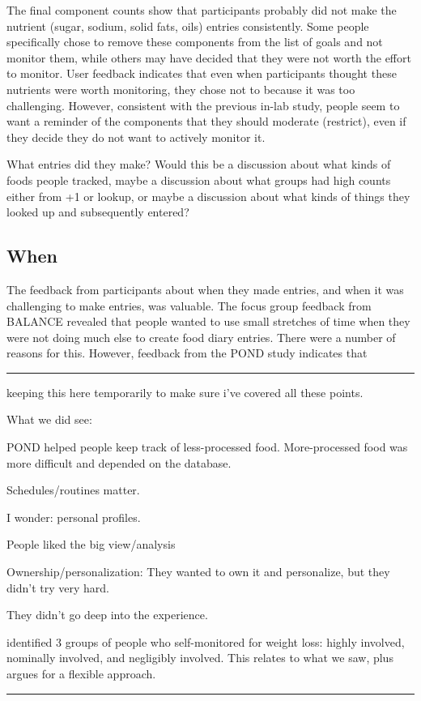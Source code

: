 The final component counts show that participants probably did not make the nutrient (sugar, sodium, solid fats, oils) entries consistently. Some people specifically chose to remove these components from the list of goals and not monitor them, while others may have decided that they were not worth the effort to monitor. User feedback indicates that even when participants thought these nutrients were worth monitoring, they chose not to because it was too challenging. However, consistent with the previous in-lab study, people seem to want a reminder of the components that they should moderate (restrict), even if they decide they do not want to actively monitor it. 

What entries did they make? Would this be a discussion about what kinds of foods people tracked, maybe a discussion about what groups had high counts either from +1 or lookup, or maybe a discussion about what kinds of things they looked up and subsequently entered? 

\subsection{When}
The feedback from participants about when they made entries, and when it was challenging to make entries, was valuable. The focus group feedback from BALANCE revealed that people wanted to use small stretches of time when they were not doing much else to create food diary entries. There were a number of reasons for this. However, feedback from the POND study indicates that 

\vspace{1cm}
\hrule
keeping this here temporarily to make sure i've covered all these points. 

What we did see: 
\begin{itemize*}
\item POND helped people keep track of less-processed food. More-processed food was more difficult and depended on the database. 
\item Schedules/routines matter. 
\item I wonder: personal profiles. 
\item People liked the big view/analysis
\item Ownership/personalization: They wanted to own it and personalize, but they didn't try very hard. 
\item They didn't go deep into the experience. 
\item \citep{burke_experiences_2009} identified 3 groups of people who self-monitored for weight loss: highly involved, nominally involved, and negligibly involved. This relates to what we saw, plus argues for a flexible approach. 
\end{itemize*}
\hrule
\vspace{1cm}

